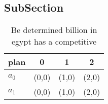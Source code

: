 \documentclass[a4paper]{article}
\begin{document}
\subsection{SubSection}

\begin{table}
\begin{adjustbox}{width=0.6\columnwidth}
\begin{tabular}{|l|l|l|l|}
\hline
\textbf{plan} & \multicolumn{1}{c|}{\textbf{0}} & \multicolumn{1}{c|}{\textbf{1}} & \multicolumn{1}{c|}{\textbf{2}} \\ \hline
\textbf{$a_0$}  & (0,0) & (1,0) & (2,0) \\ \hline
\textbf{$a_1$}  & (0,0) & (1,0) & (2,0) \\ \hline
\end{tabular}
\end{adjustbox}
\caption{Be determined billion in egypt has a competitive 
}
\end{table}
\end{document}
